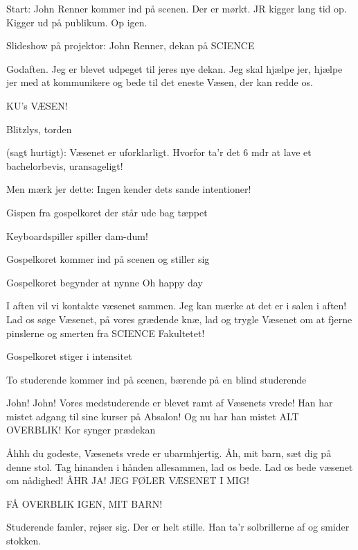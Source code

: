 \documentclass[a4paper,12pt]{article}
\begin{document}
\begin{sketch}

\scene Start: John Renner kommer ind på scenen. Der er mørkt. JR
kigger lang tid op. Kigger ud på publikum. Op igen.

Slideshow på projektor: John Renner, dekan på SCIENCE

 Godaften. Jeg er blevet udpeget til jeres nye dekan. Jeg
skal hjælpe jer, hjælpe jer med at kommunikere og bede til det eneste
Væsen, der kan redde os.

  KU's VÆSEN!

Blitzlys, torden

 (sagt hurtigt): Væsenet er uforklarligt. Hvorfor ta'r det 6
mdr at lave et bachelorbevis, uransageligt!

 Men mærk jer dette: Ingen kender dets sande intentioner!

\scene Gispen fra gospelkoret der står ude bag tæppet

\scene Keyboardspiller spiller dam-dum!

\scene Gospelkoret kommer ind på scenen og stiller sig

\scene Gospelkoret begynder at nynne Oh happy day

 I aften vil vi kontakte væsenet sammen. Jeg kan mærke at det er i salen i aften! Lad os søge Væsenet, på vores grædende knæ, lad og trygle Væsenet om at fjerne pinslerne og smerten fra SCIENCE Fakultetet! 

\scene Gospelkoret stiger i intensitet

\scene To studerende kommer ind på scenen, bærende på en blind studerende

 John! John! Vores medstuderende er blevet ramt af
Væsenets vrede! Han har mistet adgang til sine kurser på Absalon! Og
nu har han mistet ALT OVERBLIK!
\scene Kor synger prædekan

 Åhhh du godeste, Væsenets vrede er ubarmhjertig. Åh, mit barn, sæt dig på denne stol. 
Tag hinanden i hånden allesammen, lad os bede. Lad os bede væsenet om nådighed! 
ÅHR JA! JEG FØLER VÆSENET I MIG! 

 FÅ OVERBLIK IGEN, MIT BARN!


\scene Studerende famler, rejser sig. Der er helt stille. Han ta'r solbrillerne af og smider stokken.


\end{sketch}
\end{document}
